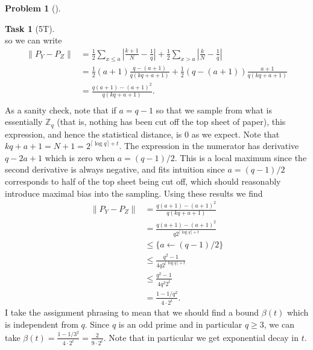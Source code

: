 \documentclass[11pt,twoside]{article}
\theoremstyle{definition}
\newtheorem{amsproblem}{Problem}
\newtheorem{amssubproblem}{Task}[amsproblem]
\newenvironment{problem}[1][]{%
  \begin{amsproblem}[#1]
  }{%
  \end{amsproblem}
}
\newenvironment{subproblem}[1][]{%
  \begin{amssubproblem}[#1]
  }{%
  \end{amssubproblem}
}
\newcommand{\TP}[1]{#1T}
\newcommand{\Z}{\mathbb{Z}}
\begin{document}
\begin{problem}
\begin{subproblem}[\TP{5}]
\[    \]
    so we can write
    \[
    \begin{aligned}
      \lVert P_Y - P_Z \rVert
      &= \frac{1}{2} \sum_{x \leq a}\left \lvert \frac{k+1}{N} - \frac{1}{q} \right \rvert + \frac{1}{2} \sum_{x > a}\left \lvert \frac{k}{N} - \frac{1}{q} \right \rvert \\
      &= \frac{1}{2}(a+1)\frac{q-(a+1)}{q(kq + a +1 )} + \frac{1}{2}(q-(a+1)) \frac{a+1}{q(kq + a+1)} \\
      &= \frac{q(a+1)-(a+1)^2}{q(kq + a +1 )}. \\
    \end{aligned}
    \]
    As a sanity check, note that if $a=q-1$ so that we sample from what is essentially $\Z_q$ (that is, nothing has been cut off the top sheet of paper), this expression, and hence the statistical distance, is 0 as we expect. Note that $kq+a+1 = N+1 = 2^{\lceil \log q \rceil + t}$. The expression in the numerator has derivative $q- 2a+1$ which is zero when $a = (q-1)/2$. This is a local maximum since the second derivative is always negative, and fits intuition since $a=(q-1)/2$ corresponds to half of the top sheet being cut off, which should reasonably introduce maximal bias into the sampling. Using these results we find
    \[
    \begin{aligned}
      \lVert P_Y - P_Z \rVert
      &= \frac{q(a+1)-(a+1)^2}{q(kq + a +1 )} \\
      &= \frac{q(a+1)-(a+1)^2}{q2^{\lceil \log q \rceil + t}} \\
      &\leq \{a \leftarrow (q-1)/2 \} \\
      &\leq \frac{q^2-1}{4q2^{\lceil \log q \rceil + t}} \\
      &\leq \frac{q^2-1}{4q^2 2^{t}} \\
      &= \frac{1-1/q^2}{4\cdot2^{t}}.
    \end{aligned}
    \]
    I take the assignment phrasing to mean that we should find a bound $\beta(t)$ which is independent from $q$. Since $q$ is an odd prime and in particular $q \geq 3$, we can take $\beta(t) = \frac{1-1/3^2}{4\cdot2^{t}} = \frac{2}{9\cdot2^{t}}$. Note that in particular we get exponential decay in $t$.
    \end{subproblem}


\end{problem}
\end{document}
